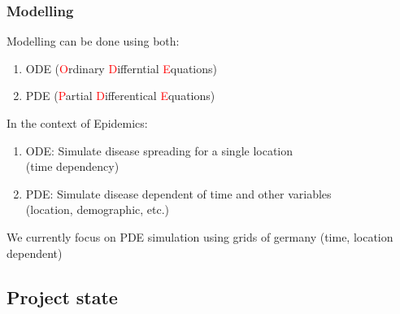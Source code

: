 \documentclass{beamer}
\begin{document}
\begin{frame}
\end{frame}

\begin{frame}
	\frametitle{Modelling}
	Modelling can be done using both:
	\begin{enumerate}[$\bullet$]
		\item ODE (\textcolor{red}{O}rdinary \textcolor{red}{D}ifferntial \textcolor{red}{E}quations)
		\item PDE (\textcolor{red}{P}artial \textcolor{red}{D}ifferentical \textcolor{red}{E}quations)
	\end{enumerate}
	\textit{ }\newline
	In the context of Epidemics:
	\begin{enumerate}[$\bullet$]
		\item ODE: Simulate disease spreading for a single location\\(time dependency)
		\item PDE: Simulate disease dependent of time and other variables\\(location, demographic, etc.) 
	\end{enumerate}
	\textit{ }\newline
	We currently focus on PDE simulation using grids of germany (time, location dependent)
\end{frame}


\subsection{Project state}
\end{document}
